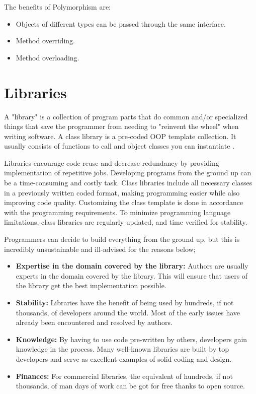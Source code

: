 The benefits of Polymorphism are:

\begin{itemize}
  \item Objects of different types can be passed through the same interface.
  \item Method overriding.
  \item Method overloading.
\end{itemize}

\section{Libraries}
A "library" is a collection of program parts that do common and/or specialized things that save the programmer from needing to "reinvent the wheel" when writing software. A class library is a pre-coded OOP template collection. It usually consists of functions to call and object classes you can instantiate \cite{stevenparker}.

Libraries encourage code reuse and decrease redundancy by providing implementation of repetitive jobs.  Developing programs from the ground up can be a time-consuming and costly task. Class libraries include all necessary classes in a previously written coded format, making programming easier while also improving code quality. Customizing the class template is done in accordance with the programming requirements. To minimize programming language limitations, class libraries are regularly updated, and time verified for stability.

Programmers can decide to build everything from the ground up, but this is incredibly unsustainable and ill-advised for the reasons below;

\begin{itemize}
  \item \textbf{Expertise in the domain covered by the library:} Authors are usually experts in the domain covered by the library. This will ensure that users of the library get the best implementation possible.
  \item \textbf{Stability:} Libraries have the benefit of being used by hundreds, if not thousands, of developers around the world. Most of the early issues have already been encountered and resolved by authors.
  \item \textbf{Knowledge:} By having to use code pre-written by others, developers gain knowledge in the process. Many well-known libraries are built by top developers and serve as excellent examples of solid coding and design.
  \item \textbf{Finances:} For commercial libraries, the equivalent of hundreds, if not thousands, of man days of work can be got for free thanks to open source.
\end{itemize}
